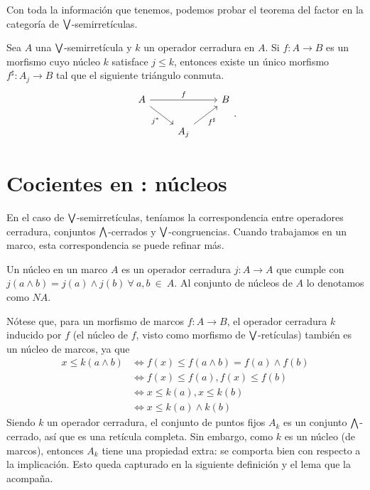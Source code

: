 Con toda la información que tenemos,
podemos probar el teorema del factor
en la categoría de $\bigvee$-semirretículas.
\begin{theorem}
    Sea $A$ una $\bigvee$-semirretícula y $k$ un operador cerradura en $A$.
    Si $f:A\to B$ es un morfismo cuyo núcleo $k$ satisface $j\leq k$,
    entonces existe un único morfismo $f^\sharp:A_j\to B$ tal que
    el siguiente triángulo conmuta.
    \[
        \begin{tikzcd}
            A \ar[rr,"f"] \ar[dr,"j^*"'] &&  B \\
            &A_j \ar[ur,"f^\sharp"']
        \end{tikzcd}
    .\]
\end{theorem}







\section{Cocientes en : núcleos}
En el caso de $\bigvee$-semirretículas, teníamos la correspondencia
entre operadores cerradura, conjuntos $\bigwedge$-cerrados
y $\bigvee$-congruencias.
Cuando trabajamos en un marco, esta correspondencia se puede refinar
más.

\begin{definition}
\label{def:nucleo}
Un núcleo en un marco $A$ es un operador cerradura $j:A \to A$ que cumple con $j(a\wedge b)=j(a)\wedge j(b) \ \forall \ a,b \ \in \ A$.
Al conjunto de núcleos de $A$ lo denotamos como $NA$.
\end{definition}

Nótese que, para un morfismo de marcos $f: A\to B$, el operador
cerradura $k$ inducido por $f$ (el núcleo de $f$, visto como morfismo
de $\bigvee$-retículas) también es un núcleo de marcos, ya que
\begin{align*}
x\leq k(a\wedge b)&\iff f(x)\leq f(a\wedge b)=f(a)\wedge f(b)\\
&\iff f(x)\leq f(a) , f(x)\leq f(b) \\
&\iff x\leq k(a), x\leq k(b)\\
& \iff x\leq k(a)\wedge k(b)
\end{align*}
Siendo $k$ un operador cerradura, el conjunto de puntos fijos $A_k$ es
un conjunto $\bigwedge$-cerrado, así que es una retícula completa. Sin
embargo, como $k$ es un núcleo (de marcos), entonces $A_k$ tiene
una propiedad extra: se comporta bien con respecto a la implicación.
Esto queda capturado en la siguiente definición y el lema que la
acompaña.

